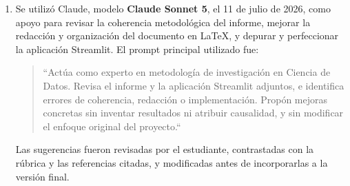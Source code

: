 \documentclass[11pt,a4paper]{article}
\begin{document}
\begin{enumerate}
  \item Se utilizó Claude, modelo \textbf{Claude Sonnet 5}, el 11 de julio de 2026, como apoyo para revisar la coherencia metodológica del informe, mejorar la redacción y organización del documento en \LaTeX{}, y depurar y perfeccionar la aplicación Streamlit. El prompt principal utilizado fue:

\begin{quote}
\small
``Actúa como experto en metodología de investigación en Ciencia de Datos. Revisa el informe y la aplicación Streamlit adjuntos, e identifica errores de coherencia, redacción o implementación. Propón mejoras concretas sin inventar resultados ni atribuir causalidad, y sin modificar el enfoque original del proyecto.``
\end{quote}

Las sugerencias fueron revisadas por el estudiante, contrastadas con la rúbrica y las referencias citadas, y modificadas antes de incorporarlas a la versión final.
\end{enumerate}
\end{document}
